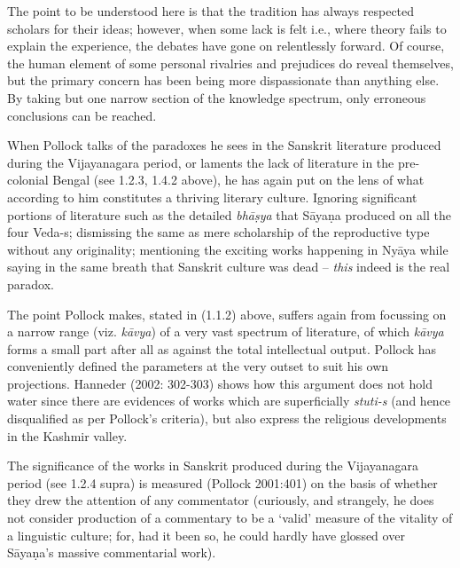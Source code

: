 The point to be understood here is that the tradition has always respected scholars for their ideas; however, when some lack is felt i.e., where theory fails to explain the experience, the debates have gone on relentlessly forward. Of course, the human element of some personal rivalries and prejudices do reveal themselves, but the primary concern has been being more dispassionate than anything else. By taking but one narrow section of the knowledge spectrum, only erroneous conclusions can be reached. 

When Pollock talks of the paradoxes he sees in the Sanskrit literature produced during the Vijayanagara period, or laments the lack of literature in the pre-colonial Bengal (see 1.2.3, 1.4.2 above), he has again put on the lens of what according to him constitutes a thriving literary culture. Ignoring significant portions of literature such as the detailed {\sl bhāṣya} that Sāyaṇa produced on all the four Veda-s; dismissing the same as mere scholarship of the reproductive type without any originality; mentioning the exciting works happening in Nyāya while saying in the same breath that Sanskrit culture was dead – {\sl this} indeed is the real paradox.

The point Pollock makes, stated in (1.1.2) above, suffers again from focussing on a narrow range (viz. {\sl kāvya}) of a very vast spectrum of literature, of which {\sl kāvya} forms a small part after all as against the total intellectual output. Pollock has conveniently defined the parameters at the very outset to suit his own projections. Hanneder (2002: 302-303) shows how this argument does not hold water since there are evidences of works which are superficially {\sl stuti-s} (and hence disqualified as per Pollock’s criteria), but also express the religious developments in the Kashmir valley. 

The significance of the works in Sanskrit produced during the Vijayanagara period (see 1.2.4 supra) is measured (Pollock 2001:401) on the basis of whether they drew the attention of any commentator (curiously, and strangely, he does not consider production of a commentary to be a ‘valid’ measure of the vitality of a linguistic culture; for, had it been so, he could hardly have glossed over Sāyaṇa’s massive commentarial work). 

